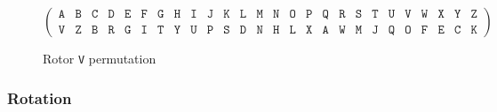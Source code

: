 \begin{center}
  \begin{figure}[h]
    \[
      \left(
        \begin{array}{llllllllllllllllllllllllll}
          \texttt{A} & \texttt{B} & \texttt{C} & \texttt{D} &
          \texttt{E} & \texttt{F} & \texttt{G} & \texttt{H} &
          \texttt{I} & \texttt{J} & \texttt{K} & \texttt{L} &
          \texttt{M} & \texttt{N} & \texttt{O} & \texttt{P} &
          \texttt{Q} & \texttt{R} & \texttt{S} & \texttt{T} &
          \texttt{U} & \texttt{V} & \texttt{W} & \texttt{X} &
          \texttt{Y} & \texttt{Z}                             \\
          \texttt{V} & \texttt{Z} & \texttt{B} & \texttt{R} &
          \texttt{G} & \texttt{I} & \texttt{T} & \texttt{Y} &
          \texttt{U} & \texttt{P} & \texttt{S} & \texttt{D} &
          \texttt{N} & \texttt{H} & \texttt{L} & \texttt{X} &
          \texttt{A} & \texttt{W} & \texttt{M} & \texttt{J} &
          \texttt{Q} & \texttt{O} & \texttt{F} & \texttt{E} &
          \texttt{C} & \texttt{K}
        \end{array}
      \right)
    \]
    \caption{Rotor \texttt{V} permutation}
    \label{fig:rotor_v_wiring}
  \end{figure}
\end{center}

\subsubsection{Rotation}

